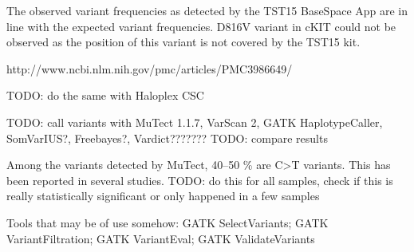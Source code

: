 The observed variant frequencies as detected by the TST15 BaseSpace App are
in line with the expected variant frequencies. D816V variant in cKIT could
not be observed as the position of this variant is not covered by the TST15 kit.

http://www.ncbi.nlm.nih.gov/pmc/articles/PMC3986649/

TODO: do the same with Haloplex CSC

TODO: call variants with MuTect 1.1.7, VarScan 2, GATK HaplotypeCaller, SomVarIUS?, Freebayes?, Vardict???????
TODO: compare results

Among the variants detected by MuTect, 40--50 \% are C>T variants. This has been reported in several studies.
TODO: do this for all samples, check if this is really statistically significant or only happened in a few samples

Tools that may be of use somehow: GATK SelectVariants; GATK VariantFiltration; GATK VariantEval; GATK ValidateVariants
